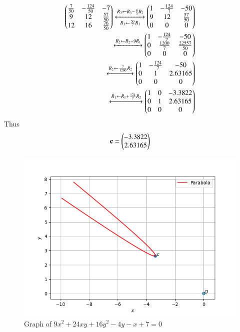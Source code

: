 \documentclass[journal,12pt,twocolumn]{IEEEtran}
\begin{document}
\begin{align*}
    \begin{pmatrix}\frac{7}{50}&-\frac{124}{50}&-7\\9&12&\frac{57}{50}\\12&16&\frac{76}{50}\end{pmatrix}\xleftrightarrow[R_1\leftarrow \frac{50}{7}R_1]{R_3\leftarrow R_3-\frac{4}{3}R_2}\begin{pmatrix}1&-\frac{124}{7}&-50\\9&12&\frac{57}{50}\\0&0&0\end{pmatrix}\\
    \xleftrightarrow{R_2\leftarrow R_2-9R_1}\begin{pmatrix}1&-\frac{124}{7}&-50\\0&\frac{1200}{7}&\frac{22557}{50}\\0&0&0\end{pmatrix}\\
    \xleftrightarrow{R_2\leftarrow\frac{7}{1200}R_2}\begin{pmatrix}1&-\frac{124}{7}&-50\\0&1&2.63165\\0&0&0\end{pmatrix}\\
    \xleftrightarrow{R_1\leftarrow R_1+\frac{124}{7}R_2}\begin{pmatrix}1&0&-3.3822\\0&1&2.63165\\0&0&0\end{pmatrix}
\end{align*}
Thus
\begin{align}
    \mathbf{c} = \begin{pmatrix}-3.3822\\2.63165\end{pmatrix}
\end{align}
\renewcommand{\thefigure}{\arabic{figure}}
  \begin{figure}[!ht]
        \centering
        \includegraphics[width=\columnwidth]{parab.png}
        \caption{Graph of $9x^2+24xy+16y^2-4y-x+7=0$}
        \label{myfig}
\end{figure}
\end{document}
